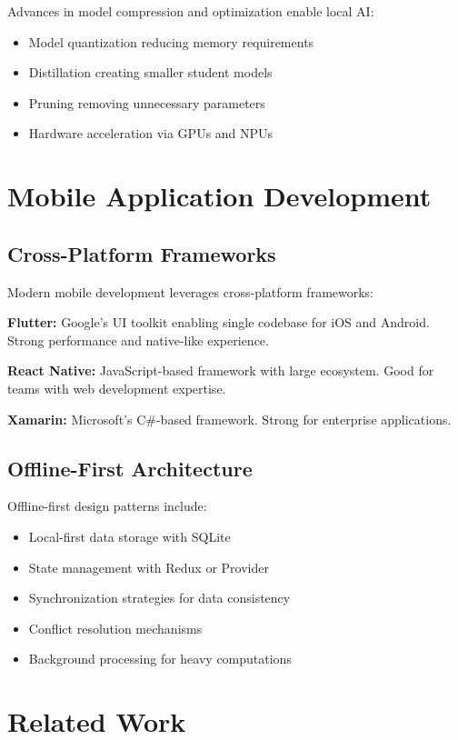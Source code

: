 \documentclass[11pt,a4paper]{report}
\begin{document}
Advances in model compression and optimization enable local AI:

\begin{itemize}
    \item Model quantization reducing memory requirements
    \item Distillation creating smaller student models
    \item Pruning removing unnecessary parameters
    \item Hardware acceleration via GPUs and NPUs
\end{itemize}

\section{Mobile Application Development}

\subsection{Cross-Platform Frameworks}

Modern mobile development leverages cross-platform frameworks:

\textbf{Flutter:} Google's UI toolkit enabling single codebase for iOS and Android. Strong performance and native-like experience.

\textbf{React Native:} JavaScript-based framework with large ecosystem. Good for teams with web development expertise.

\textbf{Xamarin:} Microsoft's C\#-based framework. Strong for enterprise applications.

\subsection{Offline-First Architecture}

Offline-first design patterns include:

\begin{itemize}
    \item Local-first data storage with SQLite
    \item State management with Redux or Provider
    \item Synchronization strategies for data consistency
    \item Conflict resolution mechanisms
    \item Background processing for heavy computations
\end{itemize}

\section{Related Work}
\end{document}
